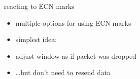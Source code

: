 \begin{frame}{reacting to ECN marks}
    \begin{itemize}
    \item multiple options for using ECN marks
    \item simplest idea:
    \vspace{.5cm}
    \item adjust window as if packet was dropped
    \item \ldots but don't need to resend data
    \end{itemize}
\end{frame}

